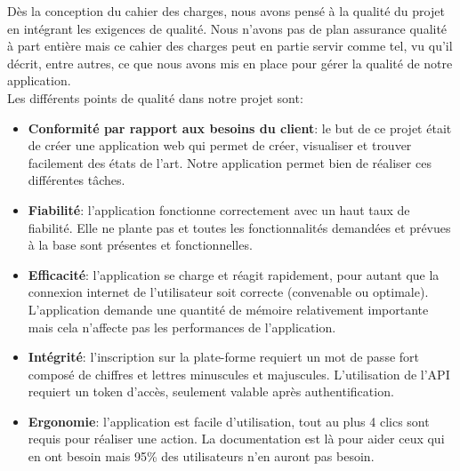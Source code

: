 \documentclass[t, 12pt, usenames,dvipsnames]{article}
\begin{document}
        \noindent Dès la conception du cahier des charges, nous avons pensé à la qualité du projet en intégrant les exigences de qualité. Nous n'avons pas de plan assurance qualité à part entière mais ce cahier des charges peut en partie servir comme tel, vu qu'il décrit, entre autres, ce que nous avons mis en place pour gérer la qualité de notre application.\\
        Les différents points de qualité dans notre projet sont:
        \begin{itemize}
            \item \textbf{Conformité par rapport aux besoins du client}: le but de ce projet était de créer une application web qui permet de créer, visualiser et trouver facilement des états de l'art. Notre application permet bien de réaliser ces différentes tâches.
            
            \item \textbf{Fiabilité}: l'application fonctionne correctement avec un haut taux de fiabilité. Elle ne plante pas et toutes les fonctionnalités demandées et prévues à la base sont présentes et fonctionnelles.
            
            \item \textbf{Efficacité}: l'application se charge et réagit rapidement, pour autant que la connexion internet de l'utilisateur soit correcte (convenable ou optimale). L'application demande une quantité de mémoire relativement importante mais cela n'affecte pas les performances de l'application.
            
            \item \textbf{Intégrité}: l'inscription sur la plate-forme requiert un mot de passe fort composé de chiffres et lettres minuscules et majuscules. L'utilisation de l'API requiert un token d'accès, seulement valable après authentification.
            
            \item \textbf{Ergonomie}: l'application est facile d'utilisation, tout au plus 4 clics sont requis pour réaliser une action. La documentation est là pour aider ceux qui en ont besoin mais 95\% des utilisateurs n'en auront pas besoin.
            

\end{itemize}
\end{document}
